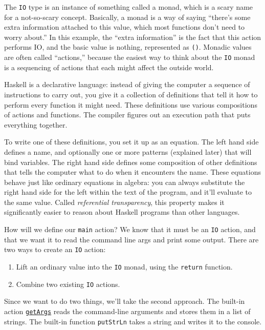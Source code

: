 The \verb|IO| type is an instance of something called a monad, which is a scary name for a not-so-scary concept. Basically, a monad is a way of saying ``there's some extra information attached to this value, which most functions don't need to worry about.'' In this example, the ``extra information'' is the fact that this action performs IO, and the basic value is nothing, represented as \lstinline|()|. Monadic values are often called ``actions,'' because the easiest way to think about the \verb|IO| monad is a sequencing of actions that each might affect the outside world.
 
Haskell is a declarative language: instead of giving the computer a sequence of instructions to carry out, you give it a collection of definitions that tell it how to perform every function it might need. These definitions use various compositions of actions and functions. The compiler figures out an execution path that puts everything together.
 
To write one of these definitions, you set it up as an equation. The left hand side defines a name, and optionally one or more patterns (explained later) that will bind variables. The right hand side defines some composition of other definitions that tells the computer what to do when it encounters the name. These equations behave just like ordinary equations in algebra: you can always substitute the right hand side for the left within the text of the program, and it'll evaluate to the same value. Called \textit{referential transparency}, this property makes it significantly easier to reason about Haskell programs than other languages.
 
How will we define our \verb|main| action? We know that it must be an \verb|IO| action, and that we want it to read the command line args and print some output. There are two ways to create an \verb|IO| action:
 
\begin{enumerate}
	\item Lift an ordinary value into the \verb|IO| monad, using the \verb|return| function.
	\item Combine two existing \verb|IO| actions.
\end{enumerate}
 
Since we want to do two things, we'll take the second approach. The built-in action \href{http://www.haskell.org/ghc/docs/6.4/html/libraries/base/System.Environment.html\#v\%3AgetArgs}{\texttt{getArgs}} reads the command-line arguments and stores them in a list of strings. The built-in function \verb|putStrLn| takes a string and writes it to the console.
 
